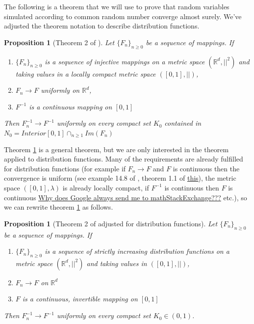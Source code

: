 \documentclass{article}
\theoremstyle{plain}%
\newtheorem{prop}[theorem]{Proposition}
\theoremstyle{definition}
\theoremstyle{remark}
\begin{document}
	The following is a theorem that we will use to prove that random variables simulated according to common random number converge almost surely. We've adjusted the theorem notation to describe distribution functions.
	\begin{prop}[Theorem 2 of \cite{invconv}]\label{thm:invconvgen}
		Let  $\{F_n\}_{n\geq 0}$ be a sequence of mappings. If
		\begin{enumerate}
			\item $\{F_n\}_{n\geq 0}$ is a sequence of injective mappings on a metric space
			$(\mathbb{R}^d,||^2)$ and taking values in a locally compact metric space $([0,1],||)$,
			\item $F_n\to F$ uniformly on $\mathbb{R}^d$, 
			\item $F^{-1}$ is a continuous mapping on $[0,1]$
		\end{enumerate}
		Then $F^{-1}_n\to F^{-1}$ uniformly on every compact set $K_0$ contained in $N_0=Interior[0,1]\cap_{n\geq 1}Im(F_n)$
	\end{prop}
	
	Theorem \ref{thm:invconvgen} is a general theorem, but we are only interested in the theorem applied to distribution functions. Many of the requirements are already fulfilled for distribution functions (for example if $F_n\to F$ and $F$ is continuous then the convergence is uniform (see example 14.8 of \cite{billingsley}, theorem 1.1 of \href{https://researchers.ms.unimelb.edu.au/~xgge@unimelb/Files/Teaching/Advanced%20Probability%20(Semester%201%202020)/Lecture%20Notes.pdf}{this}), the metric space $([0,1],\lambda)$ is already locally compact, if $F^{-1}$ is continuous then $F$ is continuous \href{https://math.stackexchange.com/questions/541082/proving-the-inverse-of-a-continuous-function-is-also-continuous}{Why does Google always send me to mathStackExchange???} etc.), so we can rewrite theorem \ref{thm:invconvgen} as follows.
	
	\begin{prop}[Theorem 2 of \cite{invconv} adjusted for distribution functions]\label{thm:invconvgen}
		Let  $\{F_n\}_{n\geq 0}$ be a sequence of mappings. If
		\begin{enumerate}
			\item $\{F_n\}_{n\geq 0}$ is a sequence of strictly increasing distribution functions on a metric space
			$(\mathbb{R}^d,||^2)$ and taking values in $([0,1],||)$, 
			\item $F_n\to F$ on $\mathbb{R}^d$
			\item $F$ is a continuous, invertible mapping on $[0,1]$
		\end{enumerate}
		Then $F^{-1}_n\to F^{-1}$ uniformly on every compact set $K_0\in (0,1)$.
	\end{prop}
	
\end{document}
